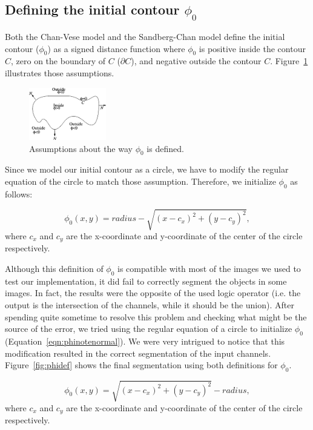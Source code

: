 \documentclass[10pt,twocolumn,letterpaper]{article}
\begin{document}
\subsection{Defining the initial contour $\phi_0$}
Both the Chan-Vese model and the Sandberg-Chan model define the initial contour ($\phi_0$) as a signed distance function where $\phi_0$ is positive inside the
contour $C$, zero on the boundary of $C$ ($\partial C$), and negative outside the contour $C$. Figure~\ref{fig:phinote} illustrates those assumptions.

\begin{figure}[t]
\centering
\includegraphics[width=0.3\textwidth]{phinote.png}
\caption{Assumptions about the way $\phi_0$ is defined.}
\label{fig:phinote}
\end{figure}

Since we model our initial contour as a circle, we have to modify the regular equation of the circle to match those assumption. Therefore, we initialize
$\phi_0$ as follows:

\begin{equation}
\label{eqn:phinote}
\phi_{0} (x, y) = radius - \sqrt{ (x - c_x)^2 + (y - c_y)^2 },
\end{equation}
where $c_x$ and $c_y$ are the x-coordinate and y-coordinate of the center of the circle respectively.

Although this definition of $\phi_0$ is compatible with most of the images we used to test our implementation, it did fail to correctly segment the objects in
some images. In fact, the results were the opposite of the used logic operator (i.e. the output is the intersection of the channels, while it should be the
union). After spending quite sometime to resolve this problem and checking what might be the source of the error, we tried using the regular equation of a
circle to initialize $\phi_0$ (Equation~\ref{eqn:phinotenormal}). We were very intrigued to notice that this modification resulted in the correct segmentation
of the input channels. Figure~\ref{fig:phidef} shows the final segmentation using both definitions for $\phi_0$.

\begin{equation}
\label{eqn:phinotenormal}
\phi_{0} (x, y) = \sqrt{ (x - c_x)^2 + (y - c_y)^2 } - radius,
\end{equation}
where $c_x$ and $c_y$ are the x-coordinate and y-coordinate of the center of the circle respectively.
\end{document}
